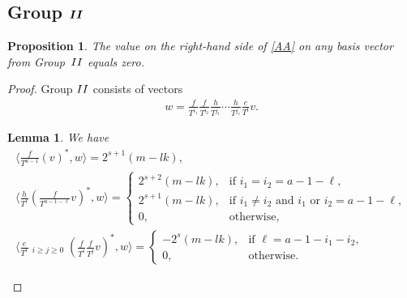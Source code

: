 \documentclass[11pt]{article}
\numberwithin{equation}{section}
\newtheorem{lem}[thm]{Lemma}
\newtheorem{prop}[thm]{Proposition}
{\theoremstyle{definition}
\newtheorem*{rem}{Remark}}
\begin{document}
\subsection[Group ${\rm II}$]{Group $\boldsymbol{{\rm II}}$}\label{subsec group 2}
\begin{prop}\label{Pr2}The value on the right-hand side of \eqref{AA} on any basis vector from Group~${\rm II}$ equals zero.
\end{prop}
\begin{proof}Group ${\rm II}$ consists of vectors
\begin{gather*}
w=\frac{f}{T^{i_1}}\frac{f}{T^{i_2}}\frac{h}{T^{j_1}} \cdots \frac{h}{T^{j_s}} \frac{e}{T^l}v.
\end{gather*}

\begin{lem}\label{Group 2} We have
\begin{gather}
\bigg\langle \frac{f}{T^{a-1}} (v)^*, w \bigg\rangle = 2^{s+1} (m - lk), \label{G21} \\
\bigg\langle \frac{h}{T^{\ell}} \left(\frac{f}{T^{a-1-\ell}}v\right)^*, w \bigg\rangle =
 \begin{cases}
 2^{s+2} (m - lk), & \text{if $i_1 = i_2 = a-1-\ell$},\\
 2^{s+1} (m - lk), & \text{if $i_1 \ne i_2$ and $i_{1}$ or $i_2 = a-1-\ell$}, \\
 0, & \text{otherwise},
 \end{cases} \label{G22} \\
\bigg\langle \frac{e}{T^{\ell}}
\mathop{\sum_{i+j=a-1-\ell}}_{i\geq j\geq 0} \left(\frac{f}{T^i}\frac{f}{T^j}v\right)^*, w \bigg\rangle =
 \begin{cases}
 - 2^{s} (m - lk), & \text{if $\ell = a-1 - i_1 - i_2$},\\
 0, & \text{otherwise}.
 \end{cases} \label{G23}
\end{gather}
\end{lem}


\end{proof}
\end{document}
